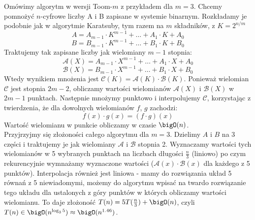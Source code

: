 Omówimy algorytm w wersji Toom-\(m\) z przykładem dla \( m = 3 \). Chcemy pomnożyć \(n\)-cyfrowe liczby A i B zapisane w systemie binarnym.
Rozkładamy je podobnie jak w algorytmie Karatsuby, tym razem na \(m\) składników, z \( K = 2^{n / m} \)
\[
	A = A_{m-1} \cdot K^{m-1} + \dots + A_1 \cdot K + A_0
\]
\[
	B = B_{m-1} \cdot K^{m-1} + \dots + B_1 \cdot K + B_0
\]
Traktujemy tak zapisane liczby jak wielomiany \(m-1\) stopnia:
\[
	\mathcal{A}(X) = A_{m-1} \cdot X^{m-1} + \dots + A_1 \cdot X + A_0
\]
\[
	\mathcal{B}(X) = B_{m-1} \cdot X^{m-1} + \dots + B_1 \cdot X + B_0
\]
Wtedy wynikiem mnożenia jest \( \mathcal{C}(K) = \mathcal{A}(K) \cdot \mathcal{B}(K) \). Ponieważ wielomian \( \mathcal{C} \) jest stopnia \( 2m-2 \), obliczamy wartości wielomianów \( \mathcal{A}(X) \) i \( \mathcal{B}(X) \) w \( 2m-1 \) punktach.
Następnie mnożymy punktowo i interpolujemy \( \mathcal{C} \), korzystając z twierdzenia, że dla dowolnych wielomianów \( f \), \( g \) zachodzi:
\[
	f(x) \cdot g(x) = (f \cdot g)(x)
\]
Wartość wielomianu w punkcie obliczamy w czasie \( \bigO(n) \). \\
Przyjrzyjmy się złożoności całego algorytmu dla \( m = 3 \). Dzielimy \( A \) i \( B \) na 3 części i traktujemy je jak wielomiany \( \mathcal{A} \) i \( \mathcal{B} \) stopnia 2. Wyznaczamy wartości tych wielomianów w 5 wybranych punktach na liczbach długości \( \frac{n}{3} \) (liniowo) po czym rekurencyjnie wymnażamy wyznaczone wartości (\(\mathcal{A}(x) \cdot \mathcal{B}(x)\) dla każdego z 5 punktów). Interpolacja również jest liniowa - mamy do rozwiązania układ 5 równań z 5 niewiadomymi, możemy do algorytmu wpisać na twardo rozwiązanie tego układu dla ustalonych z góry punktów w których obliczamy wartości wielomianu. To daje złożoność \( T(n) = 5T(\frac{n}{3}) + \bigO(n) \), czyli \( T(n) \in \bigO(n^{\log_3 5}) \approx \bigO(n^{1.46}) \).

